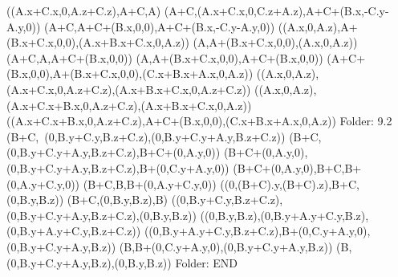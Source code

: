 \left(\left(A.x+C.x,0,A.z+C.z\right),A+C,A\right)
\left(A+C,\left(A.x+C.x,0,C.z+A.z\right),A+C+\left(B.x,-C.y-A.y,0\right)\right)
\left(A+C,A+C+\left(B.x,0,0\right),A+C+\left(B.x,-C.y-A.y,0\right)\right)
\left(\left(A.x,0,A.z\right),A+\left(B.x+C.x,0,0\right),\left(A.x+B.x+C.x,0,A.z\right)\right)
\left(A,A+\left(B.x+C.x,0,0\right),\left(A.x,0,A.z\right)\right)
\left(A+C,A,A+C+\left(B.x,0,0\right)\right)
\left(A,A+\left(B.x+C.x,0,0\right),A+C+\left(B.x,0,0\right)\right)
\left(A+C+\left(B.x,0,0\right),A+\left(B.x+C.x,0,0\right),\left(C.x+B.x+A.x,0,A.z\right)\right)
\left(\left(A.x,0,A.z\right),\left(A.x+C.x,0,A.z+C.z\right),\left(A.x+B.x+C.x,0,A.z+C.z\right)\right)
\left(\left(A.x,0,A.z\right),\left(A.x+C.x+B.x,0,A.z+C.z\right),\left(A.x+B.x+C.x,0,A.z\right)\right)
\left(\left(A.x+C.x+B.x,0,A.z+C.z\right),A+C+\left(B.x,0,0\right),\left(C.x+B.x+A.x,0,A.z\right)\right)
Folder: 9.2
\left(B+C,\ \left(0,B.y+C.y,B.z+C.z\right),\left(0,B.y+C.y+A.y,B.z+C.z\right)\right)
\left(B+C,\left(0,B.y+C.y+A.y,B.z+C.z\right),B+C+\left(0,A.y,0\right)\right)
\left(B+C+\left(0,A.y,0\right),\left(0,B.y+C.y+A.y,B.z+C.z\right),B+\left(0,C.y+A.y,0\right)\right)
\left(B+C+\left(0,A.y,0\right),B+C,B+\left(0,A.y+C.y,0\right)\right)
\left(B+C,B,B+\left(0,A.y+C.y,0\right)\right)
\left(\left(0,\left(B+C\right).y,\left(B+C\right).z\right),B+C,\left(0,B.y,B.z\right)\right)
\left(B+C,\left(0,B.y,B.z\right),B\right)
\left(\left(0,B.y+C.y,B.z+C.z\right),\left(0,B.y+C.y+A.y,B.z+C.z\right),\left(0,B.y,B.z\right)\right)
\left(\left(0,B.y,B.z\right),\left(0,B.y+A.y+C.y,B.z\right),\left(0,B.y+A.y+C.y,B.z+C.z\right)\right)
\left(\left(0,B.y+A.y+C.y,B.z+C.z\right),B+\left(0,C.y+A.y,0\right),\left(0,B.y+C.y+A.y,B.z\right)\right)
\left(B,B+\left(0,C.y+A.y,0\right),\left(0,B.y+C.y+A.y,B.z\right)\right)
\left(B,\left(0,B.y+C.y+A.y,B.z\right),\left(0,B.y,B.z\right)\right)
Folder: END
